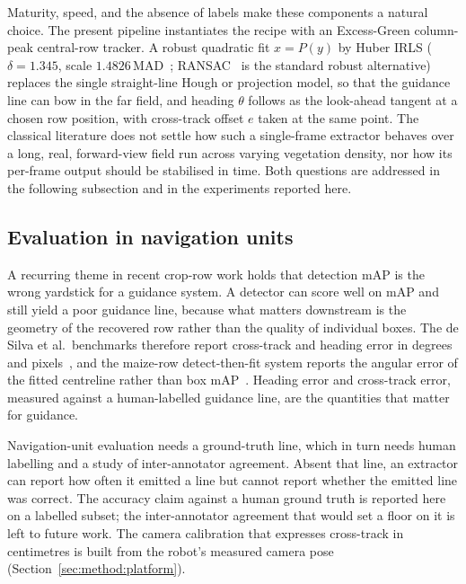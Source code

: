 Maturity, speed, and the absence of labels make these components a natural
choice. The present pipeline instantiates the recipe with an Excess-Green
column-peak central-row tracker. A robust quadratic fit $x=P(y)$ by Huber IRLS
($\delta=1.345$, scale $1.4826\,\mathrm{MAD}$~\cite{huber1964};
RANSAC~\cite{fischler1981} is the standard robust alternative) replaces the
single straight-line Hough or projection model, so that the guidance line can
bow in the far field, and heading $\theta$ follows as the look-ahead tangent at a
chosen row position, with cross-track offset $e$ taken at the same point. The
classical literature does not settle how such a single-frame extractor behaves
over a long, real, forward-view field run across varying vegetation density, nor
how its per-frame output should be stabilised in time. Both questions are
addressed in the following subsection and in the experiments reported here.

\subsection{Evaluation in navigation units}
\label{subsec:rw_eval}
A recurring theme in recent crop-row work holds that detection mAP is the wrong
yardstick for a guidance system. A detector can score well on mAP and still
yield a poor guidance line, because what matters downstream is the geometry of
the recovered row rather than the quality of individual boxes. The de Silva et
al.\ benchmarks therefore report cross-track and heading error in degrees and
pixels~\cite{cth1,cth2}, and the maize-row detect-then-fit system reports the
angular error of the fitted centreline rather than box mAP~\cite{diao_yolox}.
Heading error and cross-track error, measured against a human-labelled guidance
line, are the quantities that matter for guidance.

Navigation-unit evaluation needs a ground-truth line, which in turn needs human
labelling and a study of inter-annotator agreement. Absent that line, an
extractor can report how often it emitted a line but cannot report whether the
emitted line was correct. The accuracy claim against a human ground truth is
reported here on a labelled subset; the inter-annotator agreement that would set
a floor on it is left to future work. The camera calibration that
expresses cross-track in centimetres is built from the robot's measured camera
pose (Section~\ref{sec:method:platform}).


